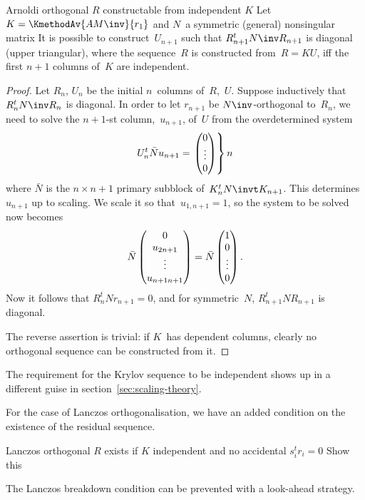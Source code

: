\documentclass[11pt]{artikel3}
\begin{document}
\begin{Outline}
\begin{llemma}{Arnoldi orthogonal $R$ constructable from independent $K$}
Let $K=\KmethodAv{AM\inv}{r_1}$ and $N$~a symmetric (general)
nonsingular matrix
It is possible to
construct~$U_{n+1}$ such that $R_{n+1}^tN\inv R_{n+1}$
is diagonal (upper triangular),
where the sequence~$R$ is
constructed from~$R=KU$, iff the first $n+1$ columns of~$K$ are independent.
\end{llemma}
\begin{proof} Let $R_n$, $U_n$ be the initial $n$~columns of~$R$,~$U$.
Suppose inductively that $R_n^tN\inv R_n$ is diagonal.
In order to let $r_{n+1}$ be $N\inv$-orthogonal to~$R_n$, we need to solve
the $n+1$-st column,~$u_{n+1}$, of~$U$ from the overdetermined system
\[ U_n^t\bar Nu_{n+1}=\left.%
        \begin{pmatrix}0\cr \vdots\cr 0\cr\end{pmatrix}\right\}n \]
where $\bar N$ is the $n\times n+1$ primary subblock of~$K_n^tN\invt K_{n+1}$.
This determines~$u_{n+1}$ up to scaling.
We scale it so that~$u_{1,n+1}=1$, so the system to be solved now
becomes
        \[ \bar N\begin{pmatrix}0\cr u_{2n+1}\cr \vdots\cr u_{n+1n+1}\end{pmatrix}
                = \bar N\begin{pmatrix}1\cr 0\cr \vdots\cr 0\end{pmatrix}. \]
Now it follows that
$R_n^tNr_{n+1}=0$, and for symmetric~$N$, $R_{n+1}^tNR_{n+1}$ is diagonal.

The reverse assertion is trivial: if $K$~has dependent columns,
clearly no orthogonal sequence can be constructed from it.
\end{proof}

The requirement for the Krylov sequence to be independent shows
up in a different guise in section~\ref{sec:scaling-theory}.

For the case of Lanczos orthogonalisation, we have an added condition
on the existence of the residual sequence.
\begin{llemma}{Lanczos orthogonal $R$ exists if $K$ independent
and no accidental $s_i^tr_i=0$}
Show this
\end{llemma}

The Lanczos breakdown condition can be prevented with a look-ahead
strategy.
\begin{comment}
\begin{theorem}
Let a sequence~$X$, a vector~$f$, and a matrix~$A$ be
given. Define residuals by $r_i=Ax_i-f$ and search directions by
$p_i=x_{i+1}-x_i$, and let transformations~ $M$,~$N$ be such that
$R=M\inv PN$, then $R$~consists of combinations of a Krylov space
of~$AM$ if and only if $N$~is upper triangular.
\end{theorem}
\begin{proof} From $X(J-I)=P$ it follows that
        \[ R(J-I)=AP=AMRN\inv \]
so      \[ R(J-I)N=AMR. \]
If $R$ is constructed from a Krylov sequence of~$AM$, $(J-I)N$~has to
be upper of Hessenberg form, from which it follows that $N$~is upper
triangular.
\end{proof}


\end{comment}
\end{Outline}
\end{document}
